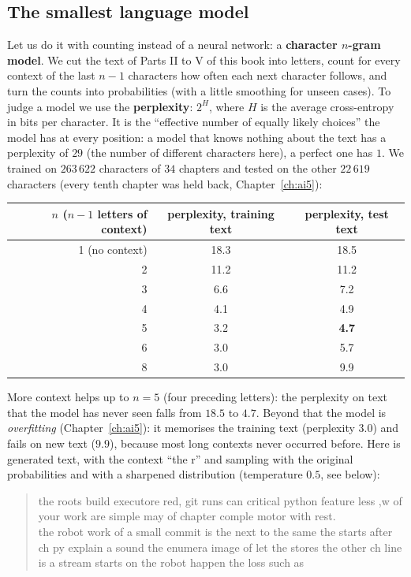 \subsection*{The smallest language model}
Let us do it with counting instead of a neural network: a \textbf{character $n$-gram model}. We cut the text of Parts II to V of this book into letters, count for every context of the last $n-1$ characters how often each next character follows, and turn the counts into probabilities (with a little smoothing for unseen cases). To judge a model we use the \textbf{perplexity}: $2^{H}$, where $H$ is the average cross-entropy in bits per character. It is the ``effective number of equally likely choices'' the model has at every position: a model that knows nothing about the text has a perplexity of $29$ (the number of different characters here), a perfect one has $1$. We trained on $263\,622$ characters of $34$ chapters and tested on the other $22\,619$ characters (every tenth chapter was held back, Chapter~\ref{ch:ai5}):
\begin{center}
\renewcommand{\arraystretch}{1.2}
\begin{tabular}{rcc}
\textbf{$n$ ($n-1$ letters of context)} & \textbf{perplexity, training text} & \textbf{perplexity, test text}\\ \hline
1 (no context) & 18.3 & 18.5\\
2 & 11.2 & 11.2\\
3 & 6.6 & 7.2\\
4 & 4.1 & 4.9\\
5 & 3.2 & \textbf{4.7}\\
6 & 3.0 & 5.7\\
8 & 3.0 & 9.9\\
\end{tabular}
\end{center}
More context helps up to $n=5$ (four preceding letters): the perplexity on text that the model has never seen falls from $18.5$ to $4.7$. Beyond that the model is \emph{overfitting} (Chapter~\ref{ch:ai5}): it memorises the training text (perplexity $3.0$) and fails on new text ($9.9$), because most long contexts never occurred before. Here is generated text, with the context ``the r'' and sampling with the original probabilities and with a sharpened distribution (temperature $0.5$, see below):
\begin{quote}\small\ttfamily
the roots build executore red, git runs can critical python feature less ,w of your work are simple may of chapter comple motor with rest.\\[2pt]
the robot work of a small commit is the next to the same the starts after ch py explain a sound the enumera image of let the stores the other ch line is a stream starts on the robot happen the loss such as
\end{quote}
